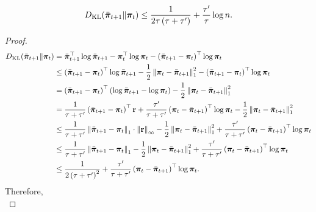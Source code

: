 \begin{lem}
\label{lem:kl_bar_tp1_t_bound}
\begin{equation*}
\begin{split}
    D_{\mathrm{KL}}{\left( \bar{{\boldsymbol{\pi}}}_{t+1} \middle\| {\boldsymbol{\pi}}_t \right)} \le \frac{1}{2\tau \left(\tau + \tau^\prime\right)} + \frac{\tau^\prime}{\tau} \log{n}.
\end{split}
\end{equation*}
\end{lem}
\begin{proof}
\begin{equation*}
\begin{split}
    D_{\mathrm{KL}}{\left( \bar{{\boldsymbol{\pi}}}_{t+1} \middle\| {\boldsymbol{\pi}}_t \right)} &= \bar{{\boldsymbol{\pi}}}_{t+1}^\top \log{\bar{{\boldsymbol{\pi}}}_{t+1}} - {\boldsymbol{\pi}}_t^\top \log{{\boldsymbol{\pi}}_t} - \left( \bar{{\boldsymbol{\pi}}}_{t+1} - {\boldsymbol{\pi}}_t  \right)^\top \log{{\boldsymbol{\pi}}_t} \\
    &\le \left( \bar{{\boldsymbol{\pi}}}_{t+1} - {\boldsymbol{\pi}}_t  \right)^\top \log{\bar{{\boldsymbol{\pi}}}_{t+1}} - \frac{1}{2} \left\| {\boldsymbol{\pi}}_t - \bar{{\boldsymbol{\pi}}}_{t+1} \right\|_1^2 - \left( \bar{{\boldsymbol{\pi}}}_{t+1} - {\boldsymbol{\pi}}_t  \right)^\top \log{{\boldsymbol{\pi}}_t} \\
    &= \left( \bar{{\boldsymbol{\pi}}}_{t+1} - {\boldsymbol{\pi}}_t  \right)^\top \left( \log{\bar{{\boldsymbol{\pi}}}_{t+1}} - \log{{\boldsymbol{\pi}}_t} \right) - \frac{1}{2} \left\| {\boldsymbol{\pi}}_t - \bar{{\boldsymbol{\pi}}}_{t+1} \right\|_1^2 \\
    &= \frac{1}{\tau + \tau^\prime} \left( \bar{{\boldsymbol{\pi}}}_{t+1} - {\boldsymbol{\pi}}_t \right)^\top {\mathbf{r}} + \frac{\tau^\prime}{\tau + \tau^\prime} \left( {\boldsymbol{\pi}}_t - \bar{{\boldsymbol{\pi}}}_{t+1} \right)^\top \log{{\boldsymbol{\pi}}_t} - \frac{1}{2} \left\| {\boldsymbol{\pi}}_t - \bar{{\boldsymbol{\pi}}}_{t+1} \right\|_1^2 \\
    &\le \frac{1}{\tau + \tau^\prime} \left\| \bar{{\boldsymbol{\pi}}}_{t+1} - {\boldsymbol{\pi}}_t \right\|_1 \cdot \left\| {\mathbf{r}} \right\|_\infty - \frac{1}{2} \left\| {\boldsymbol{\pi}}_t - \bar{{\boldsymbol{\pi}}}_{t+1} \right\|_1^2 + \frac{\tau^\prime}{\tau + \tau^\prime} \left( {\boldsymbol{\pi}}_t - \bar{{\boldsymbol{\pi}}}_{t+1} \right)^\top \log{{\boldsymbol{\pi}}_t} \\
    &\le \frac{1}{\tau + \tau^\prime} \left\| \bar{{\boldsymbol{\pi}}}_{t+1} - {\boldsymbol{\pi}}_t \right\|_1  - \frac{1}{2} \left\| {\boldsymbol{\pi}}_t - \bar{{\boldsymbol{\pi}}}_{t+1} \right\|_1^2 + \frac{\tau^\prime}{\tau + \tau^\prime} \left( {\boldsymbol{\pi}}_t - \bar{{\boldsymbol{\pi}}}_{t+1} \right)^\top \log{{\boldsymbol{\pi}}_t} \\
    &\le \frac{1}{2\left(\tau + \tau^\prime\right)^2} + \frac{\tau^\prime}{\tau + \tau^\prime} \left( {\boldsymbol{\pi}}_t - \bar{{\boldsymbol{\pi}}}_{t+1} \right)^\top \log{{\boldsymbol{\pi}}_t}.
\end{split}
\end{equation*}
Therefore,
\begin{equation*}

\end{equation*}
\end{proof}
